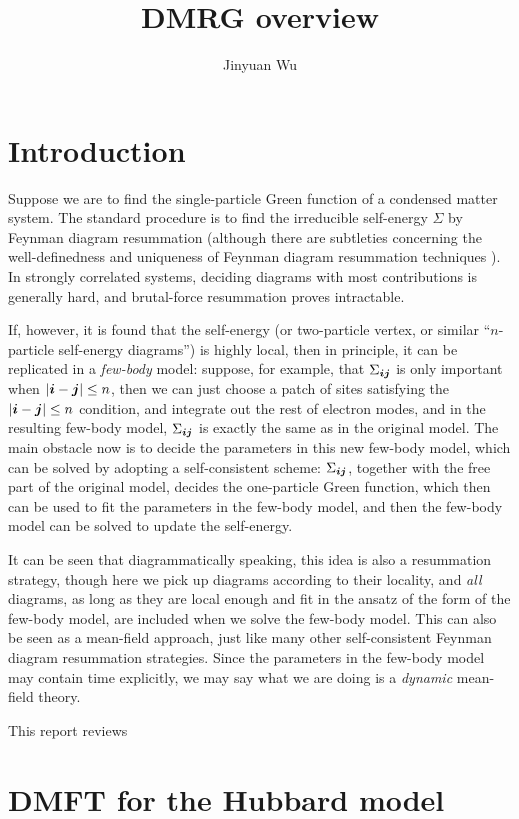 \documentclass[hyperref, a4paper]{article}
\title{DMRG overview}
\author{Jinyuan Wu}
\begin{document}
    
\maketitle

\section{Introduction}

Suppose we are to find the single-particle Green function 
of a condensed matter system.
The standard procedure is to find the irreducible self-energy $\Sigma$
by Feynman diagram resummation
(although there are subtleties 
concerning the well-definedness and uniqueness of Feynman diagram resummation techniques 
\cite{gunnarsson2017breakdown}).
In strongly correlated systems,
deciding diagrams with most contributions is generally hard,
and brutal-force resummation proves intractable.

If, however, it is found that the self-energy 
(or two-particle vertex, or similar ``$n$-particle self-energy diagrams'')
is highly local, 
then in principle,
it can be replicated in a \emph{few-body} model:
suppose, for example, that $\Sigma_{\vb*{i} \vb*{j}}$ is only important 
when $\abs{\vb*{i} - \vb*{j}} \leq n$,
then we can just choose a patch of sites satisfying the $\abs{\vb*{i} - \vb*{j}} \leq n$ condition,
and integrate out the rest of electron modes,
and in the resulting few-body model,
$\Sigma_{\vb*{i} \vb*{j}}$ is exactly the same as in the original model.
The main obstacle now is to decide the parameters in this new few-body model,
which can be solved by adopting a self-consistent scheme:
$\Sigma_{\vb*{i} \vb*{j}}$, together with the free part of the original model,
decides the one-particle Green function,
which then can be used to fit the parameters in the few-body model,
and then the few-body model can be solved to update the self-energy.

It can be seen that diagrammatically speaking, 
this idea is also a resummation strategy,
though here we pick up diagrams according to their locality,
and \emph{all} diagrams, as long as they are local enough
and fit in the ansatz of the form of the few-body model,
are included when we solve the few-body model.
This can also be seen as a mean-field approach,
just like many other self-consistent Feynman diagram resummation strategies.
Since the parameters in the few-body model may contain time explicitly,
we may say what we are doing is a \emph{dynamic} mean-field theory.

This report reviews 

\section{DMFT for the Hubbard model}

\printbibliography
\end{document}
